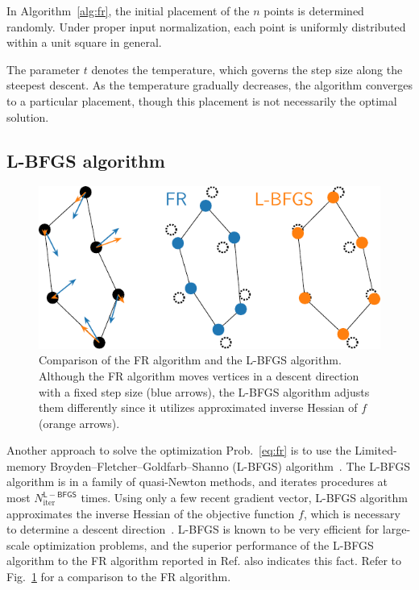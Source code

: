 \documentclass[dvipdfmx,10pt,journal,compsoc]{IEEEtran}
\begin{document}
In Algorithm~\ref{alg:fr}, the initial placement of the $n$ points is determined randomly. Under proper input normalization, each point is uniformly distributed within a unit square in general.

The parameter $t$ denotes the temperature, which governs the step size along the steepest descent. As the temperature gradually decreases, the algorithm converges to a particular placement, though this placement is not necessarily the optimal solution.

\subsection{L-BFGS algorithm}\label{ssec:lbfgs}

\begin{figure}[t]
    \centering
    \includegraphics[width=0.713\columnwidth]{comparison/comparison_FRandLBFGS.pdf}
    \caption{
        Comparison of the FR algorithm and the L-BFGS algorithm.
        Although the FR algorithm moves vertices in a descent direction with a fixed step size (blue arrows), the L-BFGS algorithm adjusts them differently since it utilizes approximated inverse Hessian of $f$ (orange arrows).
    }
    \label{fig:comparisonFRandLBFGS}
\end{figure}

Another approach to solve the optimization Prob.~\eqref{eq:fr} is to use the Limited-memory Broyden--Fletcher--Goldfarb--Shanno (L-BFGS) algorithm~\cite{6183577}.
The L-BFGS algorithm is in a family of quasi-Newton methods, and iterates procedures at most $N_\mathrm{iter}^{\mathsf{L-BFGS}}$ times.
Using only a few recent gradient vector, L-BFGS algorithm approximates the inverse Hessian of the objective function $f$, which is necessary to determine a descent direction~\cite{liuLimitedMemoryBFGS1989}.
L-BFGS is known to be very efficient for large-scale optimization problems, and the superior performance of the L-BFGS algorithm to the FR algorithm reported in Ref.\cite{6183577} also indicates this fact. Refer to Fig.~\ref{fig:comparisonFRandLBFGS} for a comparison to the FR algorithm.
\end{document}
